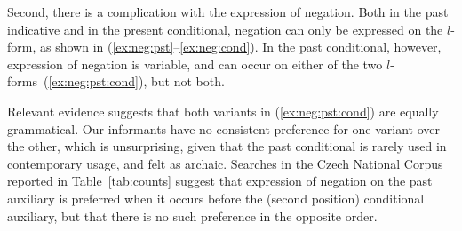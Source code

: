 \documentclass[output=paper]{langsci/langscibook}
\begin{document}
Second, there is a complication with the expression of negation. Both in the past indicative and in the present conditional, negation can only be expressed on the $l$-form, as shown in (\ref{ex:neg:pst}--\ref{ex:neg:cond}). In the past conditional, however, expression of negation is variable, and can occur  on either of the two $l$-forms~(\ref{ex:neg:pst:cond}), but not both.

\begin{exe}
\ex\label{ex:neg:pst}\begin{xlist}
\end{xlist}
\ex\label{ex:neg:cond}\begin{xlist}
\end{xlist}
\ex\label{ex:neg:pst:cond}\begin{xlist}
\end{xlist}
\end{exe}

Relevant evidence suggests that both variants in (\ref{ex:neg:pst:cond}) are equally grammatical. Our informants have no consistent preference for one variant over the other, which is unsurprising, given that the past conditional is rarely used in contemporary usage, and felt as archaic. Searches in the Czech National Corpus reported in Table~\ref{tab:counts} suggest that expression of negation on the past auxiliary is preferred when it occurs before the (second position) conditional auxiliary, but  that there is no such preference in the opposite order.
\end{document}
